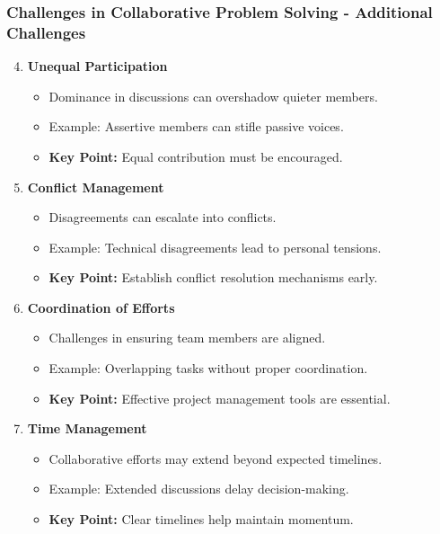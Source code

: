 \documentclass{beamer}
\begin{document}
\begin{frame}[fragile]
    \frametitle{Challenges in Collaborative Problem Solving - Additional Challenges}
    \begin{enumerate}
        \setcounter{enumi}{3}
        \item \textbf{Unequal Participation}
            \begin{itemize}
                \item Dominance in discussions can overshadow quieter members.
                \item Example: Assertive members can stifle passive voices.
                \item \textbf{Key Point:} Equal contribution must be encouraged.
            \end{itemize}

        \item \textbf{Conflict Management}
            \begin{itemize}
                \item Disagreements can escalate into conflicts.
                \item Example: Technical disagreements lead to personal tensions.
                \item \textbf{Key Point:} Establish conflict resolution mechanisms early.
            \end{itemize}

        \item \textbf{Coordination of Efforts}
            \begin{itemize}
                \item Challenges in ensuring team members are aligned.
                \item Example: Overlapping tasks without proper coordination.
                \item \textbf{Key Point:} Effective project management tools are essential.
            \end{itemize}

        \item \textbf{Time Management}
            \begin{itemize}
                \item Collaborative efforts may extend beyond expected timelines.
                \item Example: Extended discussions delay decision-making.
                \item \textbf{Key Point:} Clear timelines help maintain momentum.
            \end{itemize}
    \end{enumerate}
\end{frame}
\end{document}
